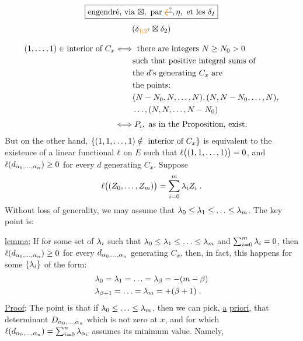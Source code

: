 \[
 \boxed{\text{engendré, via }\boxtimes,\ \text{par }\deleted{\unsure{\xi}},\eta,\text{ et les }\delta_I}
\]
\[
 (\delta_{\unsure{1|2}}\boxtimes\delta_2)
\]

\[
\begin{aligned}
(1,\ldots,1)\mathrel{\handwritten{\in}}\text{interior of }C_x
&\mathrel{\handwritten{\Longleftrightarrow}}\text{ there are integers } N\geq N_0>0\\
&\phantom{\Longleftrightarrow}\text{ such that positive integral sums of}\\
&\phantom{\Longleftrightarrow}\text{ the }d\text{'s generating }C_x\text{ are}\\
&\phantom{\Longleftrightarrow}\text{ the points:}\\
&\phantom{\Longleftrightarrow}\ (N-N_0,N,\ldots,N),(N,N-N_0,\ldots,N),\\
&\phantom{\Longleftrightarrow}\ \ldots,(N,N,\ldots,N-N_0)\\[3pt]
&\mathrel{\handwritten{\Longleftrightarrow}}P_i,\text{ as in the Proposition, exist.}
\end{aligned}
\]
But on the other hand, $\{(1,1,\ldots,1)\mathrel{\notin}\text{ interior of }C_x\}$ is equivalent to the existence of a linear functional $\ell$ on $E$ such that $\ell\bigl((1,1,\ldots,1)\bigr)=0$, and $\ell(d_{\alpha_0,\ldots,\alpha_n})\geq0$ for every $d$ generating $C_x$. Suppose
\[
\ell\bigl((Z_0,\ldots,Z_m)\bigr)=\sum_{i=0}^{m}\lambda_i Z_i\;.
\]
Without loss of generality, we may assume that $\lambda_0\leq\lambda_1\leq\ldots\leq\lambda_m$. The key point is:

\uline{lemma}: If for some set of $\lambda_i$ such that $\lambda_0\leq\lambda_1\leq\ldots\leq\lambda_m$ and $\sum_{i=0}^{m}\lambda_i=0$, then $\ell(d_{\alpha_0,\ldots,\alpha_n})\geq0$ for every $d_{\alpha_0,\ldots,\alpha_n}$ generating $C_x$, then, in fact, this happens for some $\{\lambda_i\}$ of the form:
\[
\begin{aligned}
&\lambda_0=\lambda_1=\ldots=\lambda_\beta=-(m-\beta)\\
&\lambda_{\beta+1}=\ldots=\lambda_m=+(\beta+1)\;.
\end{aligned}
\]
\uline{Proof}: The point is that if $\lambda_0\leq\ldots\leq\lambda_m$, then we can pick, \uline{a} \uline{priori}, that determinant $D_{\alpha_0,\ldots,\alpha_n}$ which is not zero at $x$, and for which $\ell(d_{\alpha_0,\ldots,\alpha_n})=\sum_{i=0}^{n}\lambda_{\alpha_i}$ assumes its minimum value. Namely,

